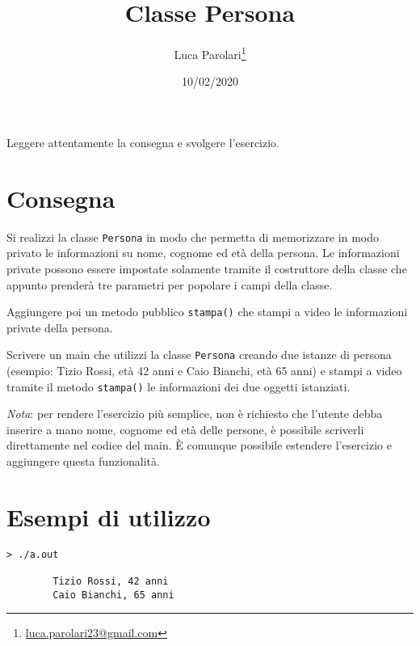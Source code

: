 \documentclass[addpoints,12pt,answers]{exam}
\author{Luca Parolari\footnote{\href{mailto:luca.parolari23@gmail.com}{luca.parolari23@gmail.com}}}
\begin{document}
    
    \title{Classe Persona}
    \date{10/02/2020}
    
    \maketitle
    
    Leggere attentamente la consegna e svolgere l'esercizio.
    
    \section{Consegna}
    Si realizzi la classe \texttt{Persona} in modo che permetta di memorizzare in modo privato le informazioni su nome, cognome ed età della persona. Le informazioni private possono essere impostate solamente tramite il costruttore della classe che appunto prenderà tre parametri per popolare i campi della classe.

    Aggiungere poi un metodo pubblico \texttt{stampa()} che stampi a video le informazioni private della persona.

    Scrivere un main che utilizzi la classe \texttt{Persona} creando due istanze di persona (esempio: Tizio Rossi, età 42 anni e Caio Bianchi, età 65 anni) e stampi a video tramite il metodo \texttt{stampa()} le informazioni dei due oggetti istanziati.

    \textit{Nota}: per rendere l'esercizio più semplice, non è richiesto che l'utente debba inserire a mano nome, cognome ed età delle persone, è possibile scriverli direttamente nel codice del main. \`E comunque possibile estendere l'esercizio e aggiungere questa funzionalità. 

   \section{Esempi di utilizzo}
    
	\begin{lstlisting}[style=verbatim]
        > ./a.out

        Tizio Rossi, 42 anni
        Caio Bianchi, 65 anni
	\end{lstlisting}
    
\end{document}
